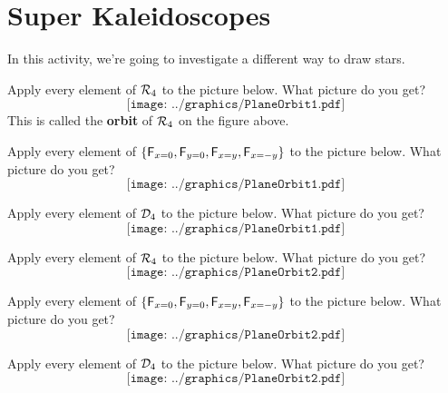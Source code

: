 \newpage
\section{Super Kaleidoscopes}

In this activity, we're going to investigate a different way to draw
stars.

\begin{prob}
Apply every element of $\mathcal R_4$ to the picture below. What picture do
you get?
\[
\texttt{[image: ../graphics/PlaneOrbit1.pdf]}
\]
This is called the \textbf{orbit} of $\mathcal R_4$ on the figure above.
\end{prob}

\vfill

\break

\begin{prob}
Apply every element of $\{\mathsf{F}_{x=0}, \mathsf{F}_{y=0}, \mathsf{F}_{x=y},\mathsf{F}_{x=-y}\}$ to the picture below. What picture do
you get?
\[
\texttt{[image: ../graphics/PlaneOrbit1.pdf]}
\]
\end{prob}

\vfill

\break

\begin{prob}
Apply every element of $\mathcal D_4$ to the picture below. What picture do
you get?
\[
\texttt{[image: ../graphics/PlaneOrbit1.pdf]}
\]
\end{prob}

\vfill

\break

\begin{prob}
Apply every element of $\mathcal R_4$ to the picture below. What picture do
you get?
\[
\texttt{[image: ../graphics/PlaneOrbit2.pdf]}
\]
\end{prob}

\vfill

\break

\begin{prob}
Apply every element of
$\{\mathsf{F}_{x=0}, \mathsf{F}_{y=0}, \mathsf{F}_{x=y},\mathsf{F}_{x=-y}\}$ to
the picture below. What picture do you get?
\[
\texttt{[image: ../graphics/PlaneOrbit2.pdf]}
\]
\end{prob}

\vfill

\break

\begin{prob}
Apply every element of $\mathcal D_4$ to the picture below. What picture do
you get?
\[
\texttt{[image: ../graphics/PlaneOrbit2.pdf]}
\]
\end{prob}

\vfill

